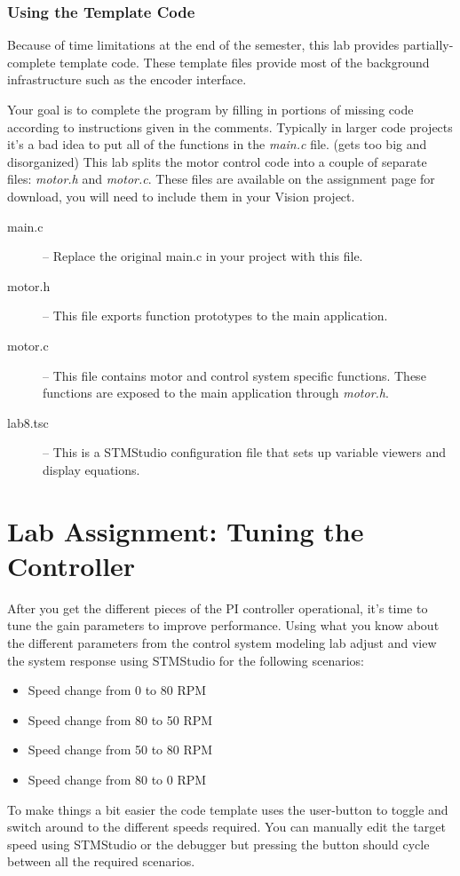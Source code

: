 \documentclass[openany,11pt,fleqn]{book} %
\begin{document}
\subsubsection{Using the Template Code}
Because of time limitations at the end of the semester, this lab provides partially-complete template code. These template files provide most of the background infrastructure such as the encoder interface.

Your goal is to complete the program by filling in portions of missing code according to instructions given in the comments. Typically in larger code projects it's a bad idea to put all of the functions in the \textit{main.c} file. (gets too big and disorganized) This lab splits the motor control code into a couple of separate files: \textit{motor.h} and \textit{motor.c}. These files are available on the assignment page for download, you will need to include them in your {\textmu}Vision project.

\begin{description}
    \item[main.c] -- Replace the original main.c in your project with this file.
    \item[motor.h] -- This file exports function prototypes to the main application.
    \item[motor.c] -- This file contains motor and control system specific functions. These functions are exposed to the main application through \textit{motor.h}. 
    \item[lab8.tsc] -- This is a STMStudio configuration file that sets up variable viewers and display equations.
\end{description}

\section{Lab Assignment: Tuning the Controller}

After you get the different pieces of the PI controller operational, it's time to tune the gain parameters to improve performance. Using what you know about the different parameters from the control system modeling lab adjust and view the system response using STMStudio for the following scenarios:

\begin{itemize}
    \item Speed change from 0 to 80 RPM
    \item Speed change from 80 to 50 RPM
    \item Speed change from 50 to 80 RPM
    \item Speed change from 80 to 0 RPM 
\end{itemize}
To make things a bit easier the code template uses the user-button to toggle and switch around to the different speeds required. You can manually edit the target speed using STMStudio or the debugger but pressing the button should cycle between all the required scenarios. 
\end{document}

